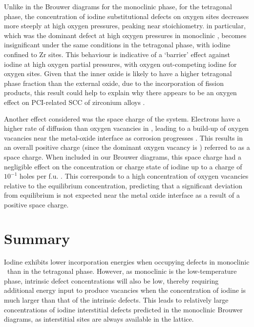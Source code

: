Unlike in the Brouwer diagrams for the monoclinic phase, for the tetragonal phase, the concentration of iodine substitutional defects on oxygen sites decreases more steeply at high oxygen pressures, peaking near stoichiometry.  in particular, which was the dominant defect at high oxygen pressures in monoclinic \zirconia , becomes insignificant under the same conditions in the tetragonal phase, with iodine confined to Zr sites. This behaviour is indicative of a `barrier' effect against iodine at high oxygen partial pressures, with oxygen out-competing iodine for oxygen sites. Given that the inner oxide is likely to have a higher tetragonal phase fraction than the external oxide, due to the incorporation of fission products, this result could help to explain why there appears to be an oxygen effect on PCI-related SCC of zirconium alloys \cite{hofmann1984stress}. 

Another effect considered was the space charge of the system. Electrons have a higher rate of diffusion than oxygen vacancies in \zirconia , leading to a build-up of oxygen vacancies near the metal-oxide interface as corrosion progresses \cite{bojinov2010influence}. This results in an overall positive charge (since the dominant oxygen vacancy is ) referred to as a space charge. When included in our Brouwer diagrams, this space charge had a negligible effect on the concentration or charge state of iodine up to a charge of $10^{-1}$ holes per f.u. \zirconia . This corresponds to a high concentration of oxygen vacancies relative to the equilibrium concentration, predicting that a significant deviation from equilibrium is not expected near the metal oxide interface as a result of a positive space charge.


\section{Summary}

Iodine exhibits lower incorporation energies when occupying defects in monoclinic \zirconia\ than in the tetragonal phase. However, as monoclinic is the low-temperature phase, intrinsic defect concentrations will also be low, thereby requiring additional energy input to produce vacancies when the concentration of iodine is much larger than that of the intrinsic defects. This leads to relatively large concentrations of iodine interstitial defects predicted in the monoclinic Brouwer diagrams, as interstitial sites are always available in the lattice. 

